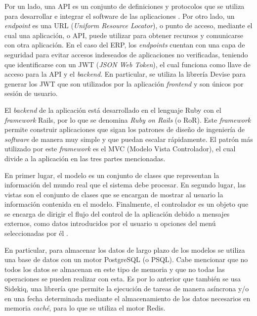     Por un lado, una API es un conjunto de definiciones y protocolos que se utiliza para desarrollar e integrar el software de las aplicaciones \cite{redhat_api}. Por otro lado, un \textit{endpoint} es una URL (\textit{Uniform Resource Locator}), o punto de acceso, mediante el cual una aplicación, o API, puede utilizar para obtener recursos y comunicarse con otra aplicación. En el caso del ERP, los \textit{endpoints} cuentan con una capa de seguridad para evitar accesos indeseados de aplicaciones no verificadas, teniendo que identificarse con un JWT (\textit{JSON Web Token}), el cual funciona como llave de acceso para la API y el \textit{backend}. En particular, se utiliza la librería Devise para generar los JWT que son utilizados por la aplicación \textit{frontend} y son únicos por sesión de usuario.
    
    El \textit{backend} de la aplicación está desarrollado en el lenguaje Ruby con el \textit{framework} Rails, por lo que se denomina \textit{Ruby on Rails} (o RoR). Este \textit{framework} permite construir aplicaciones que sigan los patrones de diseño de ingeniería de \textit{software} de manera muy simple y que puedan escalar rápidamente. El patrón más utilizado por este \textit{framework} es el MVC (Modelo Vista Controlador), el cual divide a la aplicación en las tres partes mencionadas. 
    
    En primer lugar, el modelo es un conjunto de clases que representan la información del mundo real que el sistema debe procesar. En segundo lugar, las vistas son el conjunto de clases que se encargan de mostrar al usuario la información contenida en el modelo. Finalmente, el controlador es un objeto que se encarga de dirigir el flujo del control de la aplicación debido a mensajes externos, como datos introducidos por el usuario u opciones del menú seleccionadas por él \cite{mvc_architecture}.
   
   En particular, para almacenar los datos de largo plazo de los modelos se utiliza una base de datos con un motor PostgreSQL (o PSQL). Cabe mencionar que no todos los datos se almacenan en este tipo de memoria y que no todas las operaciones se pueden realizar con esta. Es por lo anterior que también se usa Sidekiq, una librería que permite la ejecución de tareas de manera asíncrona y/o en una fecha determinada mediante el almacenamiento de los datos necesarios en memoria \textit{caché}, para lo que se utiliza el motor Redis.
   
